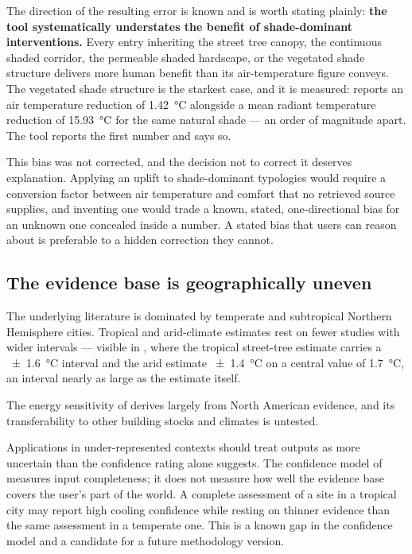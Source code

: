 The direction of the resulting error is known and is worth stating plainly:
\textbf{the tool systematically understates the benefit of shade-dominant
interventions.} Every entry inheriting the street tree canopy, the continuous
shaded corridor, the permeable shaded hardscape, or the vegetated shade
structure delivers more human benefit than its air-temperature figure conveys.
The vegetated shade structure is the starkest case, and it is measured:
\textcite{ouyang2024} reports an air temperature reduction of
\qty{1.42}{\degreeCelsius} alongside a mean radiant temperature reduction of
\qty{15.93}{\degreeCelsius} for the same natural shade --- an order of
magnitude apart. The tool reports the first number and says so.

This bias was not corrected, and the decision not to correct it deserves
explanation. Applying an uplift to shade-dominant typologies would require a
conversion factor between air temperature and comfort that no retrieved source
supplies, and inventing one would trade a known, stated, one-directional bias
for an unknown one concealed inside a number. A stated bias that users can
reason about is preferable to a hidden correction they cannot.

\subsection{The evidence base is geographically uneven}

The underlying literature is dominated by temperate and subtropical Northern
Hemisphere cities. Tropical and arid-climate estimates rest on fewer studies
with wider intervals --- visible in , where the
tropical street-tree estimate carries a \qty{\pm 1.6}{\degreeCelsius} interval
and the arid estimate \qty{\pm 1.4}{\degreeCelsius} on a central value of
\qty{1.7}{\degreeCelsius}, an interval nearly as large as the estimate itself.

The energy sensitivity of  derives largely from North American
evidence, and its transferability to other building stocks and climates is
untested.

Applications in under-represented contexts should treat outputs as more
uncertain than the confidence rating alone suggests. The confidence model of
 measures input completeness; it does not measure how well
the evidence base covers the user's part of the world. A complete assessment of
a site in a tropical city may report high cooling confidence while resting on
thinner evidence than the same assessment in a temperate one. This is a known
gap in the confidence model and a candidate for a future methodology version.

